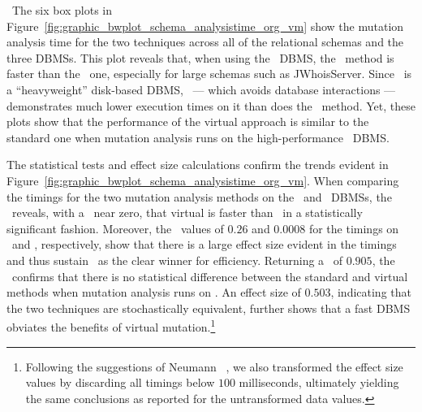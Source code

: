 

~The six box plots in Figure~\ref{fig:graphic_bwplot_schema_analysistime_org_vm} show the mutation analysis time for the two techniques across all of the relational schemas and the three DBMSs. This plot reveals that, when using the \HyperSQL~DBMS, the \virtual~method is faster than the \Original~one, especially for large schemas such as JWhoisServer. Since \Postgres~is a ``heavyweight'' disk-based DBMS, \vma~--- which avoids database interactions ---  demonstrates much lower execution times on it than does the \Original~method. Yet, these plots show that the performance of the virtual approach is similar to the standard one when mutation analysis runs on the high-performance \sqlite~DBMS.


The statistical tests and effect size calculations confirm the trends evident in Figure~\ref{fig:graphic_bwplot_schema_analysistime_org_vm}. When comparing the timings for the two mutation analysis methods on the \HyperSQL~and \Postgres~DBMSs, the \wilcoxon~reveals, with a \pvalue~near zero, that virtual is faster than \Original~in a statistically significant fashion. Moreover, the \atwelve~values of $0.26$ and $0.0008$ for the timings on \HyperSQL~and \Postgres, respectively, show that there is a large effect size evident in the timings and thus sustain \vma~as the clear winner for efficiency. Returning a \pvalue~of $0.905$, the \wilcoxon~confirms that there is no statistical difference between the standard and virtual methods when mutation analysis runs on \sqlite. An effect size of $0.503$, indicating that the two techniques are stochastically equivalent, further shows that a fast DBMS obviates the benefits of virtual mutation.\footnote{{\scriptsize Following the suggestions of Neumann \etal~\cite{Neumann2015}, we also transformed the effect size values by discarding all timings below $100$ milliseconds, ultimately yielding the same conclusions as reported for the untransformed data values.}}


